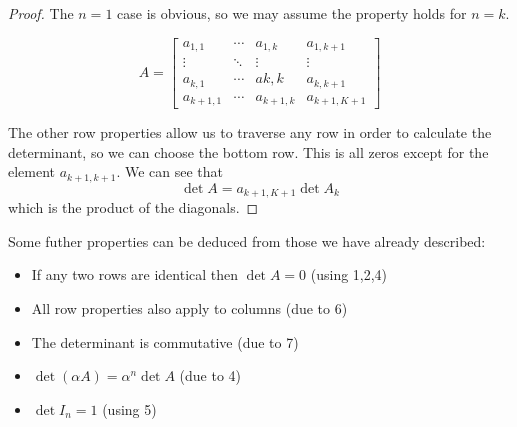 \documentclass[a4paper,10pt]{article}
\begin{document}
\begin{proof}
The $n=1$ case is obvious, so we may assume the property holds for
$n=k$.

\[
	A =
	\begin{bmatrix}
		a_{1,1}   & \cdots & a_{1,k}   & a_{1,k+1} \\
		\vdots    & \ddots & \vdots    & \vdots    \\
		a_{k,1}   & \cdots & a{k,k}    & a_{k,k+1} \\
		a_{k+1,1} & \cdots & a_{k+1,k} & a_{k+1,K+1}
	\end{bmatrix}
\]

The other row properties allow us to traverse any row in order to
calculate the determinant, so we can choose the bottom row. This is all
zeros except for the element $a_{k+1,k+1}$. We can see that
\[
	\det A = a_{k+1,K+1} \det A_k
\]
which is the product of the diagonals.
\end{proof}

Some futher properties can be deduced from those we have already described:
\begin{itemize}
	\item
		If any two rows are identical then $\det A = 0$ (using 1,2,4)
	\item
		All row properties also apply to columns (due to 6)
	\item
		The determinant is commutative (due to 7)
	\item
		$\det(\alpha A) = \alpha^n \det A$ (due to 4)
	\item
		$\det I_n = 1$ (using 5)
\end{itemize}
\end{document}
